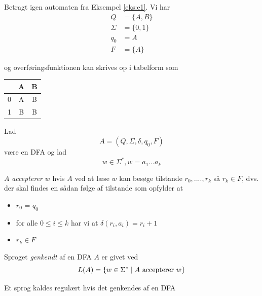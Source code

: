 \documentclass[a4paper,10pt,article]{memoir}
\begin{document}
\begin{eksempel}
Betragt igen automaten fra Eksempel \ref{eks:e1}. Vi har 
\begin{align*}
Q & = \{A,B\} \\
\Sigma & = \{0,1\} \\
q_0 & = A \\
F & = \{A\} 
\end{align*}

og overføringsfunktionen kan skrives op i tabelform som

\begin{center}
  \begin{tabular}{| l | c | c |}
    \hline
       & A & B \\ \hline
     0 & A & B \\ \hline
     1 & B & B \\
    \hline
  \end{tabular}
\end{center}
\end{eksempel}

\begin{definition}
Lad \[ A = (Q,\Sigma,\delta,q_0,F)  \]
være en DFA og lad
\[ w \in \Sigma^{\ast}, w=a_1 \ldots a_k  \]

$A$ \emph{accepterer} $w$ hvis $A$ ved at læse $w$ kan besøge
tilstande $r_0, ...., r_k$ så $r_k \in F$, dvs. der skal findes en
sådan følge af tilstande som opfylder at

\begin{itemize}
	\item $r_0$ = $q_0$
	\item for alle $0 \leq i \leq k$ har vi at $\delta(r_i, a_i)=r_i+1$
	\item $r_k \in F$ 
\end{itemize}

\end{definition}



\begin{definition}
 Sproget \emph{genkendt} af en DFA $A$ er givet ved \[ L(A) = \{ w
   \in \Sigma^{\ast} \mid A \text{ accepterer } w \}  \]
\end{definition}



\begin{definition}
 Et sprog kaldes regulært hvis det genkendes af en DFA
\end{definition}
\end{document}
